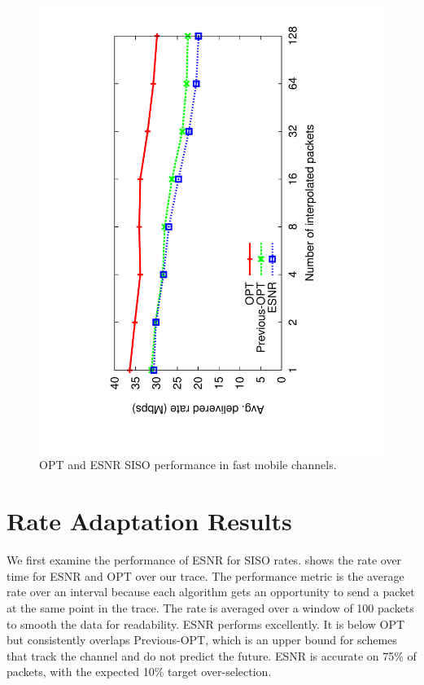 \begin{figure}[t]
      \centering
      \includegraphics[angle=-90,viewport=120 68 491 760,clip,width=0.95\columnwidth]{figures/esnr/siso_rate_skip_opt_eff.pdf}
      \caption{\label{fig:siso_rate_skip_opt_eff} OPT and ESNR SISO performance in fast mobile channels.}
\end{figure}



\section{Rate Adaptation Results}
 We first examine the performance of ESNR for SISO rates.  shows the rate over time for ESNR and OPT over our trace. The performance metric is the average rate over an interval because each algorithm gets an opportunity to send a packet at the same point in the trace. The rate is averaged over a window of 100 packets to smooth the data for readability. ESNR performs excellently. It is below OPT but consistently overlaps Previous-OPT, which is an upper bound for schemes that track the channel and do not predict the future. ESNR is accurate on 75\% of packets, with the expected 10\% target over-selection.

